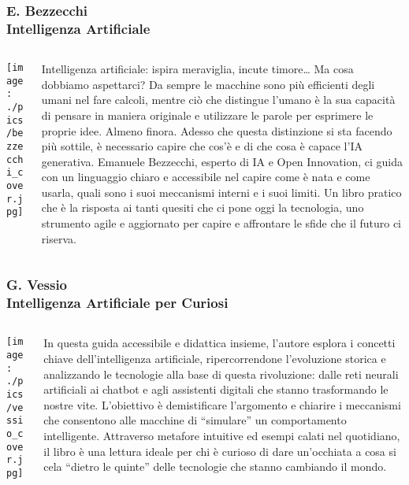 \documentclass[aspectratio=169]{beamer}
\begin{document}
%
%
\begin{frame}
\frametitle{\small E. Bezzecchi \\ \normalsize \textbf{Intelligenza Artificiale}}
\begin{columns}[c]
\begin{column}{0.35\textwidth}
    \centering
    \texttt{[image: ./pics/bezzecchi\_cover.jpg]}
\end{column}
\begin{column}{0.6\textwidth}
    {\small
    Intelligenza artificiale: ispira meraviglia, incute timore… Ma cosa dobbiamo aspettarci? Da sempre le macchine sono più efficienti degli umani nel fare calcoli, mentre ciò che distingue l’umano è la sua capacità di pensare in maniera originale e utilizzare le parole per esprimere le proprie idee. Almeno finora. Adesso che questa distinzione si sta facendo più sottile, è necessario capire che cos’è e di che cosa è capace l’IA generativa. Emanuele Bezzecchi, esperto di IA e Open Innovation, ci guida con un linguaggio chiaro e accessibile nel capire come è nata e come usarla, quali sono i suoi meccanismi interni e i suoi limiti. Un libro pratico che è la risposta ai tanti quesiti che ci pone oggi la tecnologia, uno strumento agile e aggiornato per capire e affrontare le sfide che il futuro ci riserva.}
\end{column}
\end{columns}
\end{frame}
%
%
\begin{frame}
\frametitle{\small G. Vessio \\ \normalsize \textbf{Intelligenza Artificiale per Curiosi}}
\begin{columns}[c]
\begin{column}{0.35\textwidth}
    \centering
    \texttt{[image: ./pics/vessio\_cover.jpg]}
\end{column}
\begin{column}{0.6\textwidth}
    {\small
    In questa guida accessibile e didattica insieme, l’autore esplora i concetti chiave dell’intelligenza artificiale, ripercorrendone l'evoluzione storica e analizzando le tecnologie alla base di questa rivoluzione: dalle reti neurali artificiali ai chatbot e agli assistenti digitali che stanno trasformando le nostre vite. L’obiettivo è demistificare l’argomento e chiarire i meccanismi che consentono alle macchine di “simulare” un comportamento intelligente. Attraverso metafore intuitive ed esempi calati nel quotidiano, il libro è una lettura ideale per chi è curioso di dare un’occhiata a cosa si cela “dietro le quinte” delle tecnologie che stanno cambiando il mondo.}
\end{column}
\end{columns}
\end{frame}
\end{document}
